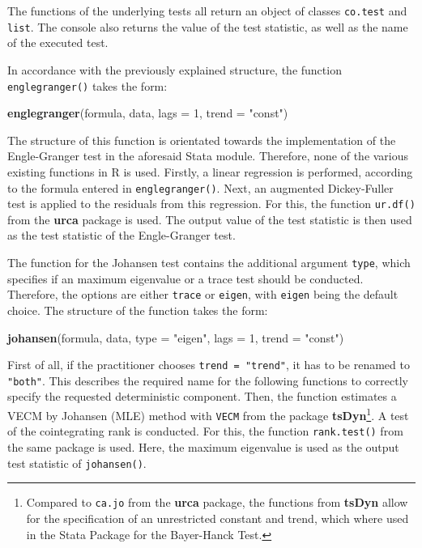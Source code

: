 \documentclass[11pt,a4paper]{article}
\newenvironment{Shaded}{\begin{snugshade}}{\end{snugshade}}
\newcommand{\DataTypeTok}[1]{\textcolor[rgb]{0.13,0.29,0.53}{#1}}
\newcommand{\DecValTok}[1]{\textcolor[rgb]{0.00,0.00,0.81}{#1}}
\newcommand{\KeywordTok}[1]{\textcolor[rgb]{0.13,0.29,0.53}{\textbf{#1}}}
\newcommand{\NormalTok}[1]{#1}
\newcommand{\StringTok}[1]{\textcolor[rgb]{0.31,0.60,0.02}{#1}}
\let\rmarkdownfootnote\footnote%
\def\footnote{\protect\rmarkdownfootnote}
\begin{document}
The functions of the underlying tests all return an object of classes
\texttt{co.test} and \texttt{list}. The console also returns the value
of the test statistic, as well as the name of the executed test.

In accordance with the previously explained structure, the function
\texttt{englegranger()} takes the form:

\begin{Shaded}
\begin{Highlighting}[]
\KeywordTok{englegranger}\NormalTok{(formula, data, }\DataTypeTok{lags =} \DecValTok{1}\NormalTok{, }\DataTypeTok{trend =} \StringTok{"const"}\NormalTok{)}
\end{Highlighting}
\end{Shaded}

The structure of this function is orientated towards the implementation
of the Engle-Granger test in the aforesaid Stata module. Therefore, none
of the various existing functions in R is used. Firstly, a linear
regression is performed, according to the formula entered in
\texttt{englegranger()}. Next, an augmented Dickey-Fuller test is
applied to the residuals from this regression. For this, the function
\texttt{ur.df()} from the \textbf{urca} package is used. The output
value of the test statistic is then used as the test statistic of the
Engle-Granger test.

The function for the Johansen test contains the additional argument
\texttt{type}, which specifies if an maximum eigenvalue or a trace test
should be conducted. Therefore, the options are either \texttt{trace} or
\texttt{eigen}, with \texttt{eigen} being the default choice. The
structure of the function takes the form:

\begin{Shaded}
\begin{Highlighting}[]
\KeywordTok{johansen}\NormalTok{(formula, data, }\DataTypeTok{type =} \StringTok{"eigen"}\NormalTok{, }\DataTypeTok{lags =} \DecValTok{1}\NormalTok{, }\DataTypeTok{trend =} \StringTok{"const"}\NormalTok{)}
\end{Highlighting}
\end{Shaded}

First of all, if the practitioner chooses \texttt{trend\ =\ "trend"}, it
has to be renamed to \texttt{"both"}. This describes the required name
for the following functions to correctly specify the requested
deterministic component. Then, the function estimates a VECM by Johansen
(MLE) method with \texttt{VECM} from the package
\textbf{tsDyn}\footnote{Compared to \texttt{ca.jo} from the
  \textbf{urca} package, the functions from \textbf{tsDyn} allow for the
  specification of an unrestricted constant and trend, which where used
  in the Stata Package for the Bayer-Hanck Test.}. A test of the
cointegrating rank is conducted. For this, the function
\texttt{rank.test()} from the same package is used. Here, the maximum
eigenvalue is used as the output test statistic of \texttt{johansen()}.
\end{document}
